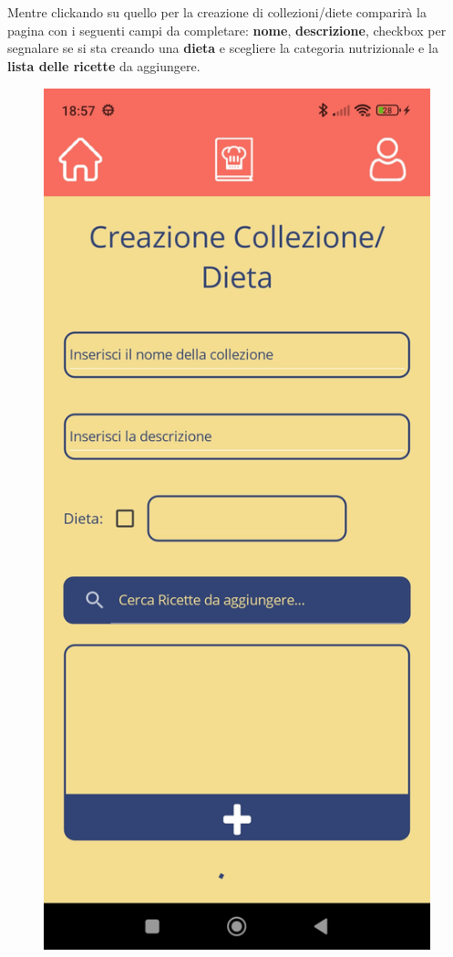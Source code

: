 ﻿\documentclass[a4paper,12pt]{report}
\begin{document}
\\\\\\\\\\\\\\Mentre clickando su quello per la creazione di collezioni/diete comparirà la pagina con i seguenti campi da completare:
\textbf{nome}, \textbf{descrizione}, checkbox per segnalare se si sta creando una \textbf{dieta} e scegliere la categoria nutrizionale e la \textbf{lista delle ricette} da aggiungere.
\begin{figure}[h!]
    \centering
    \includegraphics[width=0.5\linewidth]{app_images/CollectionCreation.jpg}
\end{figure}
\end{document}
